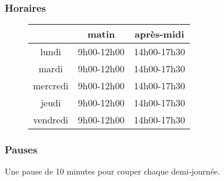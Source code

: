 
\begin{frame}
  \frametitle{Horaires}
  \begin{figure}
    \centering
    \begin{tabular}{ccc}
      \toprule
               & matin            & après-midi        \\ \midrule
      lundi    & 9h00-12h00       & 14h00-17h30       \\
      mardi    & 9h00-12h00       & 14h00-17h30       \\
      mercredi & 9h00-12h00       & 14h00-17h30       \\
      jeudi    & 9h00-12h00       & 14h00-17h30       \\
      vendredi & 9h00-12h00       & 14h00-17h30       \\
      \bottomrule
    \end{tabular}
  \end{figure}
\end{frame}

\begin{frame}
  \frametitle{Pauses}
  Une pause de 10 minutes pour couper chaque demi-journée.
\end{frame}
